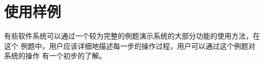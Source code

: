 \chapter{使用样例}
有些软件系统可以通过一个较为完整的例题演示系统的大部分功能的使用方法，在这个
例题中，用户应该详细地描述每一步的操作过程，用户可以通过这个例题对系统的操作
有一个初步的了解。
